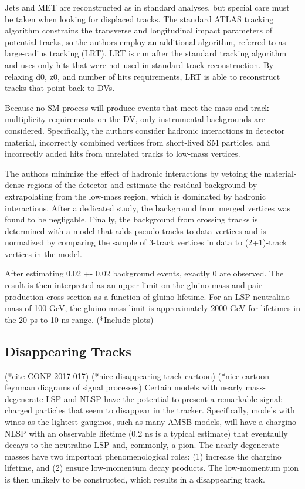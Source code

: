 \documentclass[12pt]{article}
\begin{document}
    Jets and MET are reconstructed as in standard analyses, but special care must be taken when looking for displaced tracks. The standard ATLAS tracking algorithm constrains the transverse and longitudinal impact parameters of potential tracks, so the authors employ an additional algorithm, referred to as large-radius tracking (LRT). LRT is run after the standard tracking algorithm and uses only hits that were not used in standard track reconstruction. By relaxing d0, z0, and number of hits requirements, LRT is able to reconstruct tracks that point back to DVs.
    
    Because no SM process will produce events that meet the mass and track multiplicity requirements on the DV, only instrumental backgrounds are considered. Specifically, the authors consider hadronic interactions in detector material, incorrectly combined vertices from short-lived SM particles, and incorrectly added hits from unrelated tracks to low-mass vertices.

    The authors minimize the effect of hadronic interactions by vetoing the material-dense regions of the detector and estimate the residual background by extrapolating from the low-mass region, which is dominated by hadronic interactions. After a dedicated study, the background from merged vertices was found to be negligable. Finally, the background from crossing tracks is determined with a model that adds pseudo-tracks to data vertices and is normalized by comparing the sample of 3-track vertices in data to (2+1)-track vertices in the model.

    After estimating 0.02 +- 0.02 background events, exactly 0 are observed. The result is then interpreted as an upper limit on the gluino mass and pair-production cross section as a function of gluino lifetime. For an LSP neutralino mass of 100 GeV, the gluino mass limit is approximately 2000 GeV for lifetimes in the 20 ps to 10 ns range. (*Include plots)

\subsection{Disappearing Tracks}
    (*cite CONF-2017-017)
    (*nice disappearing track cartoon)
    (*nice cartoon feynman diagrams of signal processes)
    Certain models with nearly mass-degenerate LSP and NLSP have the potential to present a remarkable signal: charged particles that seem to disappear in the tracker. Specifically, models with winos as the lightest gauginos, such as many AMSB models, will have a chargino NLSP with an observable lifetime (0.2 ns is a typical estimate) that eventaully decays to the neutralino LSP and, commonly, a pion. The nearly-degenerate masses have two important phenomenological roles: (1) increase the chargino lifetime, and (2) ensure low-momentum decay products. The low-momentum pion is then unlikely to be constructed, which results in a disappearing track.
\end{document}

